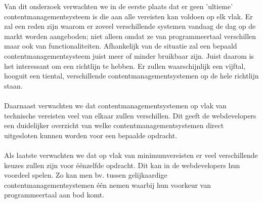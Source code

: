 Van dit onderzoek verwachten we in de eerste plaats dat er geen 'ultieme' contentmanagementsysteem is die aan alle vereisten kan voldoen op elk vlak. Er zal een reden zijn waarom er zoveel verschillende systemen vandaag de dag op de markt worden aangeboden; niet alleen omdat ze van programmeertaal verschillen maar ook van functionaliteiten. Afhankelijk van de situatie zal een bepaald contentmanagementsysteem juist meer of minder bruikbaar zijn. Juist daarom is het interessant  om een richtlijn te hebben. Er zullen waarschijnlijk een vijftal, hooguit een tiental, verschillende contentmanagementsystemen op de hele richtlijn staan.
\\\\
Daarnaast verwachten we dat contentmanagementsystemen op vlak van technische vereisten veel van elkaar zullen verschillen. Dit geeft de webdevelopers een duidelijker overzicht van welke contentmanagementsystemen direct uitgesloten kunnen worden voor een bepaalde opdracht.
\\\\
Als laatste verwachten we dat op vlak van minimumvereisten er veel verschillende keuzes zullen zijn voor éénzelfde opdracht. Dit kan in de webdevelopers hun voordeel spelen. Zo kan men bv. tussen gelijkaardige contentmanagementsystemen één nemen waarbij hun voorkeur van programmeertaal aan bod komt.  

